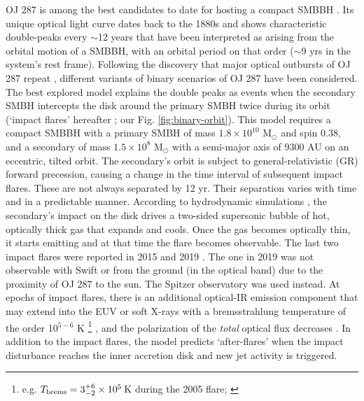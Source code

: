 \documentclass[preprints,article,accept,moreauthors,pdftex]{Definitions/mdpi}
\begin{document}
OJ 287 is among the best candidates to date for hosting a compact SMBBH \citep{Sillanpaa1988, Valtonen2008, Dey2018, Valtonen2019, Laine2020}. 
Its unique optical light curve dates back to the 1880s and shows characteristic double-peaks every $\sim$12 years \citep{Pursimo2000, Villforth2010, Hudec2013, Dey2018}
that have been interpreted as arising
from the orbital motion of a SMBBH, with an orbital period on that order ($\sim$9 yrs in the system's rest frame). 
% 
Following the discovery that major optical outbursts of OJ 287 repeat \citep{Sillanpaa1996}, different variants of binary scenarios of OJ 287 have been considered. 
The best explored model explains the double peaks as
events when the secondary SMBH intercepts the disk around the primary SMBH twice during its orbit (`impact flares' hereafter \citep{Lehto1996, Valtonen2019}; our Fig. \ref{fig:binary-orbit}). 
This model requires a compact SMBBH with a primary SMBH of mass $1.8\times10^{10}$ M$_{\odot}$ and spin 0.38, and a secondary of mass $1.5\times10^8$ M$_{\odot}$ with a semi-major axis of 9300 AU on an eccentric, tilted orbit.  The secondary's orbit is subject to general-relativistic (GR) forward precession, causing a change in the time interval of subsequent impact flares.  
These are not always separated by 12 yr. Their separation varies with time and in a predictable manner. 
According to hydrodynamic simulations \citep{Ivanov1998}, the secondary's impact on the disk drives a two-sided supersonic bubble of hot, optically thick gas that expands and cools. 
Once the gas becomes optically thin, it starts emitting and at that time the flare becomes observable.
The last two impact flares were reported in 2015 and 2019 \citep{Valtonen2016, Laine2020}. 
The one in 2019 was not observable with Swift or from the ground (in the optical band) due to the proximity of OJ 287 to the sun. The Spitzer observatory was used instead. 
At epochs of impact flares, there is an additional optical-IR emission component that may extend into the EUV or soft X-rays with a bremsstrahlung temperature of the order 10$^{5-6}$ K {\footnote{e.g. $T_{\rm brems}=3^{+6}_{-2} \times 10^5$\,K during the 2005 flare; \citep{Valtonen2012}}} \citep{Ciprini2007, Valtonen2012, Valtonen2019}, and the polarization of the {\em {total}} optical flux decreases \citep{Smith1987, Valtonen2008, Valtonen2016}.
In addition to the impact flares, the model predicts `after-flares' when the impact disturbance reaches the inner accretion disk \citep{Sundelius1997, Valtonen2009} and new jet activity is triggered. 
\end{document}
